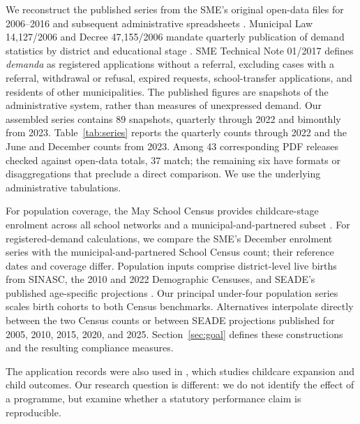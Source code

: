 We reconstruct the published series from the SME's original open-data files for 2006--2016 and subsequent administrative spreadsheets \citep{sme_dados_abertos,sme_demanda_escolar}. Municipal Law 14,127/2006 and Decree 47,155/2006 mandate quarterly publication of demand statistics by district and educational stage \citep{saopaulo2006lei14127}. SME Technical Note 01/2017 \citep{sme2017nt01} defines \emph{demanda} as registered applications without a referral, excluding cases with a referral, withdrawal or refusal, expired requests, school-transfer applications, and residents of other municipalities. The published figures are snapshots of the administrative system, rather than measures of unexpressed demand. Our assembled series contains 89 snapshots, quarterly through 2022 and bimonthly from 2023. Table~\ref{tab:series} reports the quarterly counts through 2022 and the June and December counts from 2023. Among 43 corresponding PDF releases checked against open-data totals, 37 match; the remaining six have formats or disaggregations that preclude a direct comparison. We use the underlying administrative tabulations.

For population coverage, the May School Census provides childcare-stage enrolment across all school networks and a municipal-and-partnered subset \citep{inep_censo_escolar_c}. For registered-demand calculations, we compare the SME's December enrolment series with the municipal-and-partnered School Census count; their reference dates and coverage differ. Population inputs comprise district-level live births from SINASC, the 2010 and 2022 Demographic Censuses, and SEADE's published age-specific projections \citep{sms_sinasc_tabnet,ibge_sidra1378,ibge_sidra9514,seade_idade_escolar}. Our principal under-four population series scales birth cohorts to both Census benchmarks. Alternatives interpolate directly between the two Census counts or between SEADE projections published for 2005, 2010, 2015, 2020, and 2025. Section~\ref{sec:goal} defines these constructions and the resulting compliance measures.

The application records were also used in \citet{soares2021ecd}, which studies childcare expansion and child outcomes. Our research question is different: we do not identify the effect of a programme, but examine whether a statutory performance claim is reproducible.
